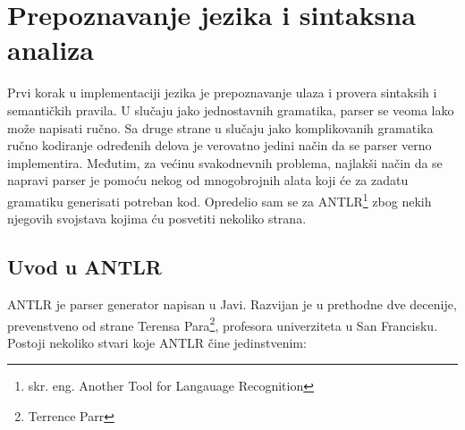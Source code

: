 \chapter{Prepoznavanje jezika i sintaksna analiza}

Prvi korak u implementaciji jezika je prepoznavanje ulaza i provera sintaksih i semantičkih pravila. U slučaju jako jednostavnih gramatika, parser se veoma lako može napisati ručno. Sa druge strane u slučaju jako komplikovanih gramatika ručno kodiranje određenih delova je verovatno jedini način da se parser verno implementira. Međutim, za većinu svakodnevnih problema, najlakši način da se napravi parser je pomoću nekog od mnogobrojnih alata koji će za zadatu gramatiku generisati potreban kod. Opredelio sam se za ANTLR\footnote{skr. eng. Another Tool for Langauage Recognition} zbog nekih njegovih svojstava kojima ću posvetiti nekoliko strana.

\section{Uvod u ANTLR}

ANTLR je parser generator napisan u Javi. Razvijan je u prethodne dve decenije, prevenstveno od strane Terensa Para\footnote{Terrence Parr}, profesora univerziteta u San Francisku. Postoji nekoliko stvari koje ANTLR čine jedinstvenim\cite{antlr-contrib}:

